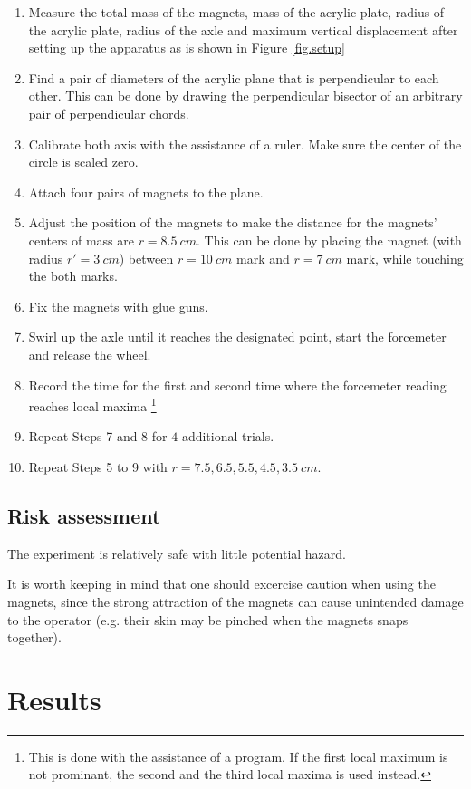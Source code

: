 \documentclass[a4paper]{article}
\begin{document}
\begin{enumerate}
    \item Measure the total mass of the magnets, mass of the acrylic plate, radius of the acrylic plate, radius of the axle and maximum vertical displacement after setting up the apparatus as is shown in Figure \ref{fig.setup}
    \item Find a pair of diameters of the acrylic plane that is perpendicular to each other. This can be done by drawing the perpendicular bisector of an arbitrary pair of perpendicular chords. 
    \item Calibrate both axis with the assistance of a ruler. Make sure the center of the circle is scaled zero. 
    \item Attach four pairs of magnets to the plane.
    \item Adjust the position of the magnets to make the distance for the magnets' centers of mass are $r = \SI{8.5}{cm}$. This can be done by placing the magnet (with radius $r' = \SI{3}{cm}$) between $r = \SI{10}{cm}$ mark and $r = \SI{7}{cm}$ mark, while touching the both marks.
    \item Fix the magnets with glue guns.
    \item Swirl up the axle until it reaches the designated point, start the forcemeter and release the wheel. 
    \item Record the time for the first and second time where the forcemeter reading reaches local maxima \footnote{This is done with the assistance of a program. If the first local maximum is not prominant, the second and the third local maxima is used instead.} 
    \item Repeat Steps 7 and 8 for $4$ additional trials.
    \item Repeat Steps 5 to 9 with $r = 7.5, 6.5, 5.5, 4.5, 3.5 \SI{}{cm}$.
\end{enumerate}

\subsection{Risk assessment}

The experiment is relatively safe with little potential hazard. 

It is worth keeping in mind that one should excercise caution when using the magnets, since the strong attraction of the magnets can cause unintended damage to the operator (e.g. their skin may be pinched when the magnets snaps together).

\section{Results}
\label{sec.results}
\end{document}

